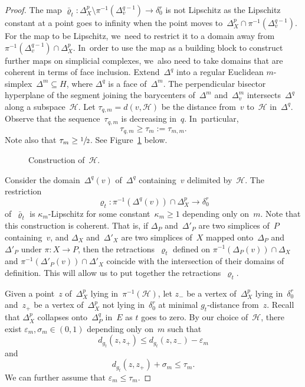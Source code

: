 \begin{proof}
The map $\bar{\varrho}_t: \Delta_X^p \setminus \pi^{-1}(\Delta_v^{q-1}) \to \delta_0^r$ is not Lipschitz as the Lipschitz constant at a point goes to infinity when the point moves to~$ \Delta_X^p \cap \pi^{-1}(\Delta_v^{q-1})$.
For the map to be Lipschitz, we~need to restrict it to a domain away from~$\pi^{-1}(\Delta_v^{q-1}) \cap \Delta_X^p$. In~order to use the map as a building block to construct further maps on simplicial complexes, we~also need to take domains that are coherent in terms of face inclusion.
Extend~$\Delta^q$ into a regular Euclidean $m$\nobreakdash-simplex~$\Delta^m \subseteq H$, where $\Delta^q$ is a face of~$\Delta^m$.
The perpendicular bisector hyperplane of the segment joining the barycenters of~$\Delta^m$ and~$\Delta_v^m$ intersects~$\Delta^q$ along a subspace~$\mathcal{H}$.
Let $\tau_{q,m} = d(v,\mathcal{H})$ be the distance from~$v$ to~$\mathcal{H}$ in~$\Delta^q$.
Observe that the sequence~$\tau_{q,m}$ is decreasing in~$q$. In~particular,
\[
\tau_{q,m} \geq \tau_m:=\tau_{m,m}.
\]
Note also that $\tau_m \geq \sfrac{1}{2}$.
See Figure~\ref{fig:construction} below.

\begin{figure}[htbp!]
\vspace{0.5cm}
\hspace{0cm}
\def\svgwidth{5cm}

\caption{Construction of~$\mathcal{H}$.} \label{fig:construction}
\end{figure}

Consider the domain~$\Delta^q(v)$ of~$\Delta^q$ containing~$v$ delimited by~$\mathcal{H}$.
The restriction
\[
\varrho_t: \pi^{-1}(\Delta^q(v)) \cap \Delta_X^p \to \delta_0^r
\]
of~$\bar{\varrho}_t$ is $\kappa_m$-Lipschitz for some constant~$\kappa_m \geq 1$ depending only on~$m$. Note that this construction is coherent.
That is, if $\Delta_P$ and~$\Delta'_P$ are two simplices of~$P$ containing~$v$, and $\Delta_X$ and~$\Delta'_X$ are two simplices of~$X$ mapped onto~$\Delta_P$ and~$\Delta'_P$ under $\pi:X \to P$, then the retractions~$\varrho_t$ defined on $\pi^{-1}(\Delta_P(v)) \cap \Delta_X$ and $\pi^{-1}(\Delta'_P(v)) \cap \Delta'_X$ coincide with the intersection of their domains of definition.
This will allow us to put together the retractions~$\varrho_t$.

Given a point~$z$ of~$\Delta_X^p$ lying in~$\pi^{-1}(\mathcal{H})$, let $z_-$ be a vertex of~$\Delta_X^p$ lying in~$\delta_0^r$ and~$z_+$ be a vertex of~$\Delta_X^p$ not lying in~$\delta_0^r$ at minimal $g_t$-distance from~$z$.
Recall that $\Delta_X^p$ collapses onto~$\Delta_P^q$ in~$E$ as $t$ goes to zero.
By our choice of~$\mathcal{H}$, there exist $\varepsilon_m, \sigma_m \in (0,1)$ depending only on~$m$ such that
\[
d_{g_t}(z,z_+) \leq d_{g_t}(z,z_-) - \varepsilon_m
\]
and
\[
d_{g_t}(z,z_+) + \sigma_m \leq \tau_m.
\]
We can further assume that $\varepsilon_m \leq \tau_m$.


\end{proof}
